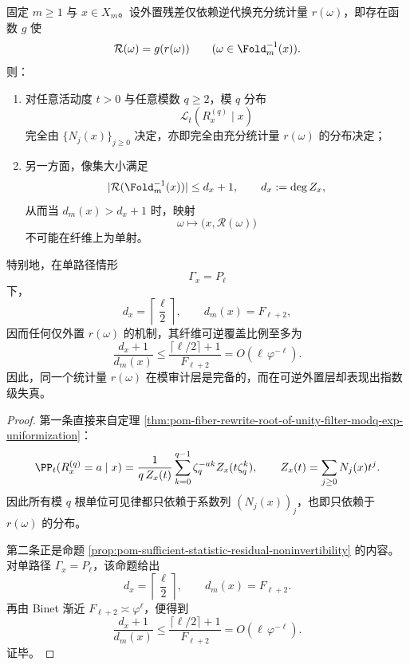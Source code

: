 \begin{theorem}[充分统计量的模完备性与可逆外置的指数失真]\label{thm:conclusion-fiber-sufficient-statistic-mod-complete-reversible-distortion}
固定 \(m\ge 1\) 与 \(x\in X_m\)。设外置残差仅依赖逆代换充分统计量 \(r(\omega)\)，即存在函数 \(g\) 使
\[
\mathcal R(\omega)=g(r(\omega))
\qquad
(\omega\in\Fold_m^{-1}(x)).
\]
则：
\begin{enumerate}
  \item 对任意活动度 \(t>0\) 与任意模数 \(q\ge 2\)，模 \(q\) 分布
  \[
  \mathcal L_t(R_x^{(q)}\mid x)
  \]
  完全由 \(\{N_j(x)\}_{j\ge 0}\) 决定，亦即完全由充分统计量 \(r(\omega)\) 的分布决定；
  \item 另一方面，像集大小满足
  \[
  |\mathcal R(\Fold_m^{-1}(x))|\le d_x+1,
  \qquad
  d_x:=\deg Z_x,
  \]
  从而当 \(d_m(x)>d_x+1\) 时，映射
  \[
  \omega\longmapsto \bigl(x,\mathcal R(\omega)\bigr)
  \]
  不可能在纤维上为单射。
\end{enumerate}
特别地，在单路径情形
\[
\Gamma_x=P_\ell
\]
下，
\[
d_x=\left\lceil\frac{\ell}{2}\right\rceil,
\qquad
d_m(x)=F_{\ell+2},
\]
因而任何仅外置 \(r(\omega)\) 的机制，其纤维可逆覆盖比例至多为
\[
\frac{d_x+1}{d_m(x)}
\le
\frac{\lceil \ell/2\rceil+1}{F_{\ell+2}}
=
O(\ell\,\varphi^{-\ell}).
\]
因此，同一个统计量 \(r(\omega)\) 在模审计层是完备的，而在可逆外置层却表现出指数级失真。
\end{theorem}
\begin{proof}
第一条直接来自定理 \ref{thm:pom-fiber-rewrite-root-of-unity-filter-modq-exp-uniformization}：
\[
\PP_t(R_x^{(q)}=a\mid x)
=
\frac{1}{q\,Z_x(t)}\sum_{k=0}^{q-1}\zeta_q^{-ak}Z_x(t\zeta_q^k),
\qquad
Z_x(t)=\sum_{j\ge 0}N_j(x)t^j.
\]
因此所有模 \(q\) 根单位可见律都只依赖于系数列 \((N_j(x))_j\)，也即只依赖于 \(r(\omega)\) 的分布。

第二条正是命题 \ref{prop:pom-sufficient-statistic-residual-noninvertibility} 的内容。对单路径 \(\Gamma_x=P_\ell\)，该命题给出
\[
d_x=\left\lceil\frac{\ell}{2}\right\rceil,
\qquad
d_m(x)=F_{\ell+2}.
\]
再由 Binet 渐近 \(F_{\ell+2}\asymp \varphi^\ell\)，便得到
\[
\frac{d_x+1}{d_m(x)}
\le
\frac{\lceil \ell/2\rceil+1}{F_{\ell+2}}
=
O(\ell\,\varphi^{-\ell}).
\]
证毕。
\end{proof}

